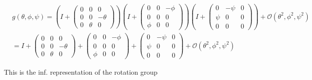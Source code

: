 \documentclass[11pt]{article}
\begin{document}
\begin{equation}
\begin{split}
        &g(\theta, \phi, \psi ) = \left(I+\begin{pmatrix} 0&0&0 \\ 0 & 0 & -\theta \\ 0&\theta&0 \end{pmatrix} \right)\left(I+\begin{pmatrix} 0&0&-\phi \\ 0 & 0 &0 \\ \phi&0&0 \end{pmatrix} \right)\left(I+\begin{pmatrix} 0&-\psi&0 \\ \psi & 0 & 0 \\ 0&0&0 \end{pmatrix} \right) + \mathcal{O}(\theta^2,\phi^2,\psi^2) \\ & = 
        I + \begin{pmatrix} 0&0&0 \\ 0 & 0 & -\theta \\ 0&\theta&0 \end{pmatrix} + \begin{pmatrix} 0&0&-\phi \\ 0 & 0 &0 \\ \phi&0&0 \end{pmatrix} + \begin{pmatrix} 0&-\psi&0 \\ \psi & 0 & 0 \\ 0&0&0 \end{pmatrix} + \mathcal{O}(\theta^2,\phi^2,\psi^2)
\end{split}
\end{equation}

This is the inf. representation of the rotation group


\subsection{}
\end{document}
